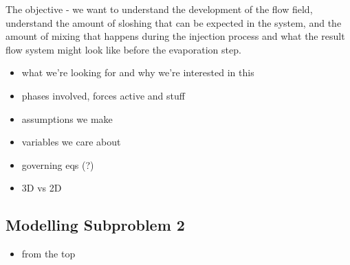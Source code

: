 The objective - we want to understand the development of the flow field, 
 understand the amount of sloshing that can be expected in the system, and the amount of
 mixing that happens during the injection process and what the result flow system might look like 
 before the evaporation step. 


\begin{itemize}
   \item what we're looking for and why we're interested in this
   \item phases involved, forces active and stuff
   \item assumptions we make
   \item variables we care about
   \item governing eqs (?)
   \item 3D vs 2D
\end{itemize}

\subsection{Modelling Subproblem 2}
\begin{itemize}
  \item from the top 
\end{itemize}